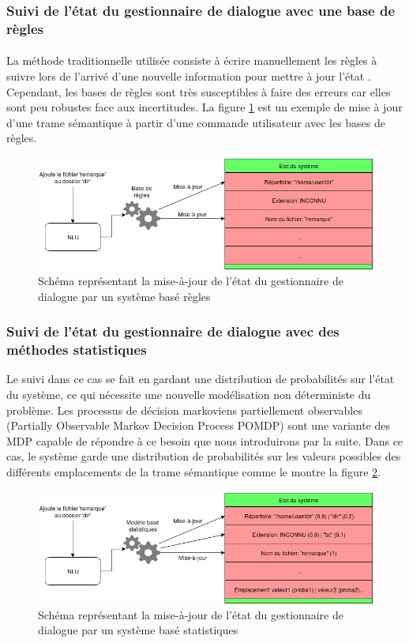 \subsubsection{Suivi de l'état du gestionnaire de dialogue avec une base de règles}\label{suivi}
\paragraph{}
La méthode traditionnelle utilisée consiste à écrire manuellement les règles à suivre lors de l'arrivé d'une nouvelle information pour mettre à jour l'état \citep{Goddeau1996}. Cependant, les bases de règles sont très susceptibles à faire des erreurs \citep{Chen2017} car elles sont peu robustes face aux incertitudes. La figure \ref{RBUpdate} est un exemple de mise à jour d'une trame sémantique à partir d'une commande utilisateur avec les bases de règles.


\begin{figure}[H]
	\centering
	\includegraphics[width=.7\linewidth]{images/DM/RuleBasedUpdate.png} 
	\caption{Schéma représentant la mise-à-jour de l'état du gestionnaire de dialogue par un système basé règles}\label{RBUpdate}
\end{figure}

\subsubsection{Suivi de l'état du gestionnaire de dialogue avec des méthodes statistiques}

Le suivi dans ce cas se fait en gardant une distribution de probabilités sur l'état du système, ce qui nécessite une nouvelle modélisation non déterministe du problème. Les processus de décision markoviens partiellement observables (Partially Observable Markov Decision Process POMDP) \citep{Young2010} sont une variante des MDP capable de répondre à ce besoin que nous introduirons par la suite. Dans ce cas, le système garde une distribution de probabilités sur les valeurs possibles des différents emplacements de la trame sémantique comme le montre la figure \ref{SBUpdate}.

\begin{figure}[H]
	\centering
	\includegraphics[width=.7\linewidth]{images/DM/StatBasedUpdate.png} 
	\caption{Schéma représentant la mise-à-jour de l'état du gestionnaire de dialogue par un système basé statistiques}\label{SBUpdate}
\end{figure}

